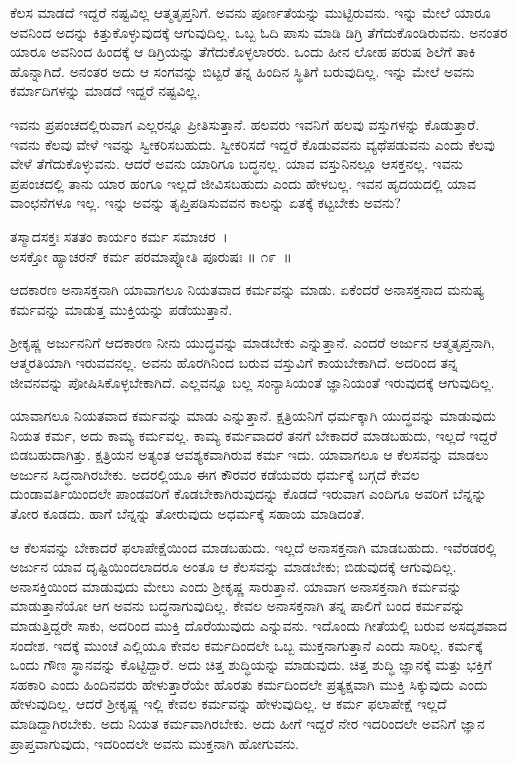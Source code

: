 ಕೆಲಸ ಮಾಡದೆ ಇದ್ದರೆ ನಷ್ಟವಿಲ್ಲ ಆತ್ಮತೃಪ್ತನಿಗೆ. ಅವನು ಪೂರ್ಣತೆಯನ್ನು ಮುಟ್ಟಿರುವನು. ಇನ್ನು ಮೇಲೆ ಯಾರೂ ಅವನಿಂದ ಅದನ್ನು ಕಿತ್ತುಕೊಳ್ಳುವುದಕ್ಕೆ ಆಗುವುದಿಲ್ಲ. ಒಬ್ಬ ಓದಿ ಪಾಸು ಮಾಡಿ ಡಿಗ್ರಿ ತೆಗೆದುಕೊಂಡಿರುವನು. ಅನಂತರ ಯಾರೂ ಅವನಿಂದ ಹಿಂದಕ್ಕೆ ಆ ಡಿಗ್ರಿಯನ್ನು ತೆಗೆದುಕೊಳ್ಳಲಾರರು. ಒಂದು ಹೀನ ಲೋಹ ಪರುಷ ಶಿಲೆಗೆ ತಾಕಿ ಹೊನ್ನಾಗಿದೆ. ಅನಂತರ ಅದು ಆ ಸಂಗವನ್ನು ಬಿಟ್ಟರೆ ತನ್ನ ಹಿಂದಿನ ಸ್ಥಿತಿಗೆ ಬರುವುದಿಲ್ಲ. ಇನ್ನು ಮೇಲೆ ಅವನು ಕರ್ಮಾದಿಗಳನ್ನು ಮಾಡದೆ ಇದ್ದರೆ ನಷ್ಟವಿಲ್ಲ.

ಇವನು ಪ್ರಪಂಚದಲ್ಲಿರುವಾಗ ಎಲ್ಲರನ್ನೂ ಪ್ರೀತಿಸುತ್ತಾನೆ. ಹಲವರು ಇವನಿಗೆ ಹಲವು ವಸ್ತುಗಳನ್ನು ಕೊಡುತ್ತಾರೆ. ಇವನು ಕೆಲವು ವೇಳೆ ಇವನ್ನು ಸ್ವೀಕರಿಸಬಹುದು. ಸ್ವೀಕರಿಸದೆ ಇದ್ದರೆ ಕೊಡುವವನು ವ್ಯಥೆಪಡುವನು ಎಂದು ಕೆಲವು ವೇಳೆ ತೆಗೆದುಕೊಳ್ಳುವನು. ಆದರೆ ಅವನು ಯಾರಿಗೂ ಬದ್ಧನಲ್ಲ. ಯಾವ ವಸ್ತುನಿನಲ್ಲೂ ಆಸಕ್ತನಲ್ಲ. ಇವನು ಪ್ರಪಂಚದಲ್ಲಿ ತಾನು ಯಾರ ಹಂಗೂ ಇಲ್ಲದೆ ಜೀವಿಸಬಹುದು ಎಂದು ಹೇಳಬಲ್ಲ. ಇವನ ಹೃದಯದಲ್ಲಿ ಯಾವ ವಾಂಛನೆಗಳೂ ಇಲ್ಲ. ಇನ್ನು ಅವನ್ನು ತೃಪ್ತಿಪಡಿಸುವವನ ಕಾಲನ್ನು ಏತಕ್ಕೆ ಕಟ್ಟಬೇಕು ಅವನು?

\begin{shloka}
ತಸ್ಮಾದಸಕ್ತಃ ಸತತಂ ಕಾರ್ಯಂ ಕರ್ಮ ಸಮಾಚರ~।\\ಅಸಕ್ತೋ ಹ್ಯಾಚರನ್ ಕರ್ಮ ಪರಮಾಪ್ನೋತಿ ಪೂರುಷಃ \hfill॥ ೧೯~॥
\end{shloka}

\begin{artha}
ಆದಕಾರಣ ಅನಾಸಕ್ತನಾಗಿ ಯಾವಾಗಲೂ ನಿಯತವಾದ ಕರ್ಮವನ್ನು ಮಾಡು. ಏಕೆಂದರೆ ಅನಾಸಕ್ತನಾದ ಮನುಷ್ಯ ಕರ್ಮವನ್ನು ಮಾಡುತ್ತ ಮುಕ್ತಿಯನ್ನು ಪಡೆಯುತ್ತಾನೆ.
\end{artha}

ಶ‍್ರೀಕೃಷ್ಣ ಅರ್ಜುನನಿಗೆ ಆದಕಾರಣ ನೀನು ಯುದ್ಧವನ್ನು ಮಾಡಬೇಕು ಎನ್ನುತ್ತಾನೆ. ಎಂದರೆ ಅರ್ಜುನ ಆತ್ಮತೃಪ್ತನಾಗಿ, ಆತ್ಮರತಿಯಾಗಿ ಇರುವವನಲ್ಲ. ಅವನು ಹೊರಗಿನಿಂದ ಬರುವ ವಸ್ತುವಿಗೆ ಕಾಯಬೇಕಾಗಿದೆ. ಅದರಿಂದ ತನ್ನ ಜೀವನವನ್ನು ಪೋಷಿಸಿಕೊಳ್ಳಬೇಕಾಗಿದೆ. ಎಲ್ಲವನ್ನೂ ಬಲ್ಲ ಸಂನ್ಯಾಸಿಯಂತೆ ಜ್ಞಾನಿಯಂತೆ ಇರುವುದಕ್ಕೆ ಆಗುವುದಿಲ್ಲ.

ಯಾವಾಗಲೂ ನಿಯತವಾದ ಕರ್ಮವನ್ನು ಮಾಡು ಎನ್ನುತ್ತಾನೆ. ಕ್ಷತ್ರಿಯನಿಗೆ ಧರ್ಮಕ್ಕಾಗಿ ಯುದ್ಧವನ್ನು ಮಾಡುವುದು ನಿಯತ ಕರ್ಮ, ಅದು ಕಾಮ್ಯ ಕರ್ಮವಲ್ಲ. ಕಾಮ್ಯ ಕರ್ಮವಾದರೆ ತನಗೆ ಬೇಕಾದರೆ ಮಾಡಬಹುದು, ಇಲ್ಲದೆ ಇದ್ದರೆ ಬಿಡಬಹುದಾಗಿತ್ತು. ಕ್ಷತ್ರಿಯನ ಅತ್ಯಂತ ಆವಶ್ಯಕವಾಗಿರುವ ಕರ್ಮ ಇದು. ಯಾವಾಗಲೂ ಆ ಕೆಲಸವನ್ನು ಮಾಡಲು ಅರ್ಜುನ ಸಿದ್ಧನಾಗಿರಬೇಕು. ಅದರಲ್ಲಿಯೂ ಈಗ ಕೌರವರ ಕಡೆಯವರು ಧರ್ಮಕ್ಕೆ ಬಗ್ಗದೆ ಕೇವಲ ದುಂಡಾವರ್ತಿಯಿಂದಲೇ ಪಾಂಡವರಿಗೆ ಕೊಡಬೇಕಾಗಿರುವುದನ್ನು ಕೊಡದೆ ಇರುವಾಗ ಎಂದಿಗೂ ಅವರಿಗೆ ಬೆನ್ನನ್ನು ತೋರ ಕೂಡದು. ಹಾಗೆ ಬೆನ್ನನ್ನು ತೋರುವುದು ಅಧರ್ಮಕ್ಕೆ ಸಹಾಯ ಮಾಡಿದಂತೆ.

ಆ ಕೆಲಸವನ್ನು ಬೇಕಾದರೆ ಫಲಾಪೇಕ್ಷೆಯಿಂದ ಮಾಡಬಹುದು. ಇಲ್ಲದೆ ಅನಾಸಕ್ತನಾಗಿ ಮಾಡಬಹುದು. ಇವೆರಡರಲ್ಲಿ ಅರ್ಜುನ ಯಾವ ದೃಷ್ಟಿಯಿಂದಲಾದರೂ ಅಂತೂ ಆ ಕೆಲಸವನ್ನು ಮಾಡಬೇಕು; ಬಿಡುವುದಕ್ಕೆ ಆಗುವುದಿಲ್ಲ. ಅನಾಸಕ್ತಿಯಿಂದ ಮಾಡುವುದು ಮೇಲು ಎಂದು ಶ‍್ರೀಕೃಷ್ಣ ಸಾರುತ್ತಾನೆ. ಯಾವಾಗ ಅನಾಸಕ್ತನಾಗಿ ಕರ್ಮವನ್ನು ಮಾಡುತ್ತಾನೆಯೋ ಆಗ ಅವನು ಬದ್ಧನಾಗುವುದಿಲ್ಲ. ಕೇವಲ ಅನಾಸಕ್ತನಾಗಿ ತನ್ನ ಪಾಲಿಗೆ ಬಂದ ಕರ್ಮವನ್ನು ಮಾಡುತ್ತಿದ್ದರೇ ಸಾಕು, ಅದರಿಂದ ಮುಕ್ತಿ ದೊರೆಯುವುದು ಎನ್ನುವನು. ಇದೊಂದು ಗೀತೆಯಲ್ಲಿ ಬರುವ ಅಸದೃಶವಾದ ಸಂದೇಶ. ಇದಕ್ಕೆ ಮುಂಚೆ ಎಲ್ಲಿಯೂ ಕೇವಲ ಕರ್ಮದಿಂದಲೇ ಒಬ್ಬ ಮುಕ್ತನಾಗುತ್ತಾನೆ ಎಂದು ಸಾರಿಲ್ಲ. ಕರ್ಮಕ್ಕೆ ಒಂದು ಗೌಣ ಸ್ಥಾನವನ್ನು ಕೊಟ್ಟಿದ್ದಾರೆ. ಅದು ಚಿತ್ತ ಶುದ್ಧಿಯನ್ನು ಮಾಡುವುದು. ಚಿತ್ತ ಶುದ್ಧಿ ಜ್ಞಾನಕ್ಕೆ ಮತ್ತು ಭಕ್ತಿಗೆ ಸಹಕಾರಿ ಎಂದು ಹಿಂದಿನವರು ಹೇಳುತ್ತಾರೆಯೇ ಹೊರತು ಕರ್ಮದಿಂದಲೇ ಪ್ರತ್ಯಕ್ಷವಾಗಿ ಮುಕ್ತಿ ಸಿಕ್ಕುವುದು ಎಂದು ಹೇಳುವುದಿಲ್ಲ. ಆದರೆ ಶ‍್ರೀಕೃಷ್ಣ ಇಲ್ಲಿ ಕೇವಲ ಕರ್ಮವನ್ನು ಹೇಳುವುದಿಲ್ಲ. ಆ ಕರ್ಮ ಫಲಾಪೇಕ್ಷೆ ಇಲ್ಲದೆ ಮಾಡಿದ್ದಾಗಿರಬೇಕು. ಅದು ನಿಯತ ಕರ್ಮವಾಗಿರಬೇಕು. ಅದು ಹೀಗೆ ಇದ್ದರೆ ನೇರ ಇದರಿಂದಲೇ ಅವನಿಗೆ ಜ್ಞಾನ ಪ್ರಾಪ್ತವಾಗುವುದು, ಇದರಿಂದಲೇ ಅವನು ಮುಕ್ತನಾಗಿ ಹೋಗುವನು.

